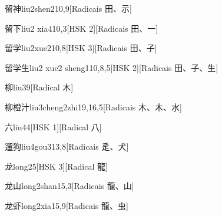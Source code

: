 \begin{entry}{留神}{liu2shen2}{10,9}[Radicais ⽥、⽰]
\end{entry}

\begin{entry}{留下}{liu2 xia4}{10,3}[HSK 2][Radicais ⽥、⼀]
\end{entry}

\begin{entry}{留学}{liu2xue2}{10,8}[HSK 3][Radicais ⽥、⼦]
\end{entry}

\begin{entry}{留学生}{liu2 xue2 sheng1}{10,8,5}[HSK 2][Radicais ⽥、⼦、⽣]
\end{entry}

\begin{entry}{柳}{liu3}{9}[Radical ⽊]
\end{entry}

\begin{entry}{柳橙汁}{liu3cheng2zhi1}{9,16,5}[Radicais ⽊、⽊、⽔]
\end{entry}

\begin{entry}{六}{liu4}{4}[HSK 1][Radical ⼋]
\end{entry}

\begin{entry}{遛狗}{liu4gou3}{13,8}[Radicais ⾡、⽝]
\end{entry}

\begin{entry}{龙}{long2}{5}[HSK 3][Radical ⿓]
\end{entry}

\begin{entry}{龙山}{long2shan1}{5,3}[Radicais ⿓、⼭]
\end{entry}

\begin{entry}{龙虾}{long2xia1}{5,9}[Radicais ⿓、⾍]
\end{entry}

